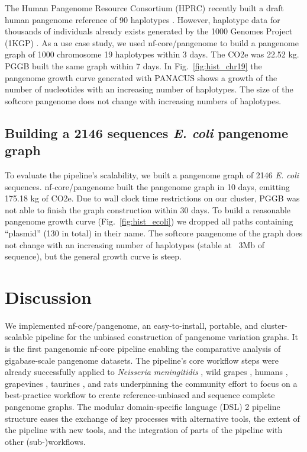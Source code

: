 \documentclass{bioinfo}
\theoremstyle{definition}
\begin{document}
	The Human Pangenome Resource Consortium (HPRC) recently built a draft human pangenome reference of 90 haplotypes \citep{Liao2023}. 
	However, haplotype data for thousands of individuals already exists generated by the 1000 Genomes Project (1KGP) \citep{Durbin2010}. 
	As a use case study, we used nf-core/pangenome to build a pangenome graph of 1000 chromosome 19 haplotypes \citep{Kuhnle2020} within 3 days. 
	The CO2e was 22.52 kg. PGGB built the same graph within 7 days. 
	In Fig.~\ref{fig:hist_chr19} the pangenome growth curve generated with PANACUS \citep{Liao2023} shows a growth of the number of nucleotides with an increasing number of haplotypes.
	The size of the softcore pangenome does not change with increasing numbers of haplotypes.
	
	\subsection{Building a 2146 sequences \textit{E. coli} pangenome graph}
	
	To evaluate the pipeline’s scalability, we built a pangenome graph of 2146 \textit{E. coli} sequences. 
	nf-core/pangenome built the pangenome graph in 10 days, emitting 175.18 kg of CO2e. 
	Due to wall clock time restrictions on our cluster, PGGB was not able to finish the graph construction within 30 days. 
	To build a reasonable pangenome growth curve (Fig.~\ref{fig:hist_ecoli}) we dropped all paths containing “plasmid” (130 in total) in their name. 
	The softcore pangenome of the graph does not change with an increasing number of haplotypes (stable at ~3Mb of sequence), but the general growth curve is steep. 

	\vspace{-0.5cm}
	\section{Discussion}
	
	We implemented nf-core/pangenome, an easy-to-install, portable, and cluster-scalable pipeline for the unbiased construction of pangenome variation graphs. 
	It is the first pangenomic nf-core pipeline enabling the comparative analysis of gigabase-scale pangenome datasets. 
	The pipeline’s core workflow steps were already successfully applied to \textit{Neisseria meningitidis} \citep{Yang2023}, wild grapes \citep{Cochetel2023}, humans \citep{Guarracino2023, Liao2023}, grapevines \citep{Guo2024}, taurines \citep{Milia2024}, and rats \citep{Villani2024} underpinning the community effort to focus on a best-practice workflow to create reference-unbiased and sequence complete pangenome graphs. 
	The modular domain-specific language (DSL) 2 pipeline structure eases the exchange of key processes with alternative tools, the extent of the pipeline with new tools, and the integration of parts of the pipeline with other (sub-)workflows.
	
\end{document}
